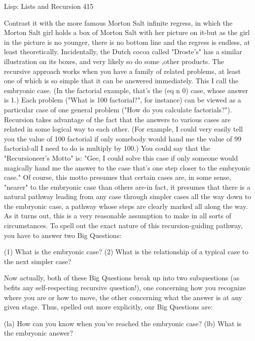Lisp: Lists and Recursion                                                             415

Contrast it with the more famous Morton Salt infinite regress, in which the Morton
Salt girl holds a box of Morton Salt with her picture on it-but as the girl in the picture
is no younger, there is no bottom line and the regress is endless, at least theoretically.
Incidentally, the Dutch cocoa called "Droste's" has a similar illustration on its boxes,
and very likely so do some ,other products.
        The recursive approach works when you have a family of related problems, at
least one of which is so simple that it can be answered immediately. This I call the
embryonic case. (In the factorial example, that's the (eq n 0) case, whose answer is 1.)
Each problem ("What is 100 factorial?", for instance) can be viewed as a particular
case of one general problem ("How do you calculate factorials?"). Recursion takes
advantage of the fact that the answers to various cases are related in some logical way
to each other. (For example, I could very easily tell you the value of 100 factorial if
only somebody would hand me the value of 99 factorial-all I need to do is multiply by
100.) You could say that the "Recursioneer's Motto" is: "Gee, I could solve this case if
only someone would magically hand me the answer to the case that's one step closer
to the embryonic case." Of course, this motto presumes that certain cases are, in some
sense, "nearer" to the embryonic case than others are-in fact, it presumes that there is
a natural pathway leading from any case through simpler cases all the way down to
the embryonic case, a pathway whose steps are clearly marked all along the way.
        As it turns out, this is a very reasonable assumption to make in all sorts of
circumstances. To spell out the exact nature of this recursion-guiding pathway, you
have to answer two Big Questions:

       (1) What is the embryonic case?
       (2) What is the relationship of a typical case to the next simpler case?

Now actually, both of these Big Questions break up into two subquestions (as befits
any self-respecting recursive question!), one concerning how you recognize where
you are or how to move, the other concerning what the answer is at any given stage.
Thus, spelled out more explicitly, our Big Questions are:

       (la) How can you know when you've reached the embryonic case? (lb) What is
the embryonic answer?

